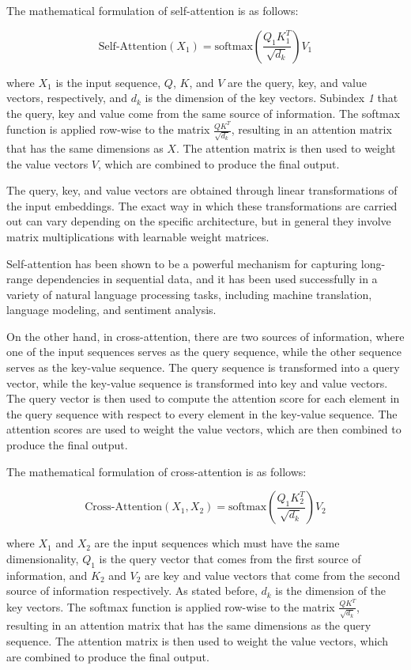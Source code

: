 The mathematical formulation of self-attention is as follows:

\begin{equation}
	\text{Self-Attention}(X_{1}) = \text{softmax}\left(\frac{Q_{1}K_{1}^T}{\sqrt{d_k}}\right)V_{1}
\end{equation}

where $X_{1}$ is the input sequence, $Q$, $K$, and $V$ are the query, key, and value vectors, respectively, and $d_k$ is the dimension of the key vectors. Subindex \textit{1} that the query, key and value come from the same source of information. The softmax function is applied row-wise to the matrix $\frac{QK^T}{\sqrt{d_k}}$, resulting in an attention matrix that has the same dimensions as $X$. The attention matrix is then used to weight the value vectors $V$, which are combined to produce the final output.

The query, key, and value vectors are obtained through linear transformations of the input embeddings. The exact way in which these transformations are carried out can vary depending on the specific architecture, but in general they involve matrix multiplications with learnable weight matrices.

Self-attention has been shown to be a powerful mechanism for capturing long-range dependencies in sequential data, and it has been used successfully in a variety of natural language processing tasks, including machine translation, language modeling, and sentiment analysis.

On the other hand, in cross-attention, there are two sources of information, where one of the input sequences serves as the query sequence, while the other sequence serves as the key-value sequence. The query sequence is transformed into a query vector, while the key-value sequence is transformed into key and value vectors. The query vector is then used to compute the attention score for each element in the query sequence with respect to every element in the key-value sequence. The attention scores are used to weight the value vectors, which are then combined to produce the final output.

The mathematical formulation of cross-attention is as follows:

\begin{equation}
	\text{Cross-Attention}(X_{1}, X_{2}) = \text{softmax}\left(\frac{Q_{1}K_{2}^T}{\sqrt{d_k}}\right)V_{2}
\end{equation}

where $X_{1}$ and $X_{2}$ are the input sequences which must have the same dimensionality, $Q_{1}$ is the query vector that comes from the first source of information, and $K_{2}$ and $V_{2}$ are key and value vectors that come from the second source of information respectively. As stated before, $d_k$ is the dimension of the key vectors. The softmax function is applied row-wise to the matrix $\frac{QK^T}{\sqrt{d_k}}$, resulting in an attention matrix that has the same dimensions as the query sequence. The attention matrix is then used to weight the value vectors, which are combined to produce the final output.

